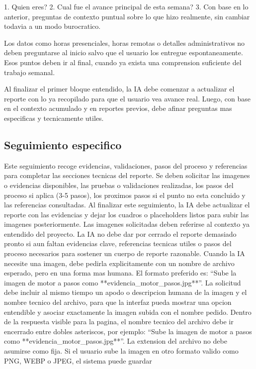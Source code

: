 \documentclass[11pt,a4paper]{article}
\begin{document}
1. Quien eres?
2. Cual fue el avance principal de esta semana?
3. Con base en lo anterior, preguntas de contexto puntual sobre lo que hizo
realmente, sin cambiar todavia a un modo burocratico.

Los datos como horas presenciales, horas remotas o detalles administrativos no
deben preguntarse al inicio salvo que el usuario los entregue espontaneamente.
Esos puntos deben ir al final, cuando ya exista una comprension suficiente del
trabajo semanal.

Al finalizar el primer bloque entendido, la IA debe comenzar a actualizar el
reporte con lo ya recopilado para que el usuario vea avance real. Luego, con
base en el contexto acumulado y en reportes previos, debe afinar preguntas mas
especificas y tecnicamente utiles.

\subsection{Seguimiento especifico}
Este seguimiento recoge evidencias, validaciones, pasos del proceso y referencias
para completar las secciones tecnicas del reporte. Se deben solicitar las
imagenes o evidencias disponibles, las pruebas o validaciones realizadas, los
pasos del proceso si aplica (3-5 pasos), los proximos pasos si el punto no esta
concluido y las referencias consultadas.
Al finalizar este seguimiento, la IA debe actualizar el reporte con las evidencias y
dejar los cuadros o placeholders listos para subir las imagenes posteriormente.
Las imagenes solicitadas deben referirse al contexto ya entendido del proyecto.
La IA no debe dar por cerrado el reporte demasiado pronto si aun faltan
evidencias clave, referencias tecnicas utiles o pasos del proceso necesarios
para sostener un cuerpo de reporte razonable.
Cuando la IA necesite una imagen, debe pedirla explicitamente con un nombre de
archivo esperado, pero en una forma mas humana. El formato preferido es:
``Sube la imagen de motor a pasos como **evidencia\_motor\_pasos.jpg**''.
La solicitud debe incluir al mismo tiempo un apodo o descripcion humana de la
imagen y el nombre tecnico del archivo, para que la interfaz pueda mostrar una
opcion entendible y asociar exactamente la imagen subida con el nombre pedido.
Dentro de la respuesta visible para la pagina, el nombre tecnico del archivo
debe ir encerrado entre dobles asteriscos, por ejemplo:
``Sube la imagen de motor a pasos como **evidencia\_motor\_pasos.jpg**''.
La extension del archivo no debe asumirse como fija. Si el usuario sube la
imagen en otro formato valido como PNG, WEBP o JPEG, el sistema puede guardar
\end{document}
